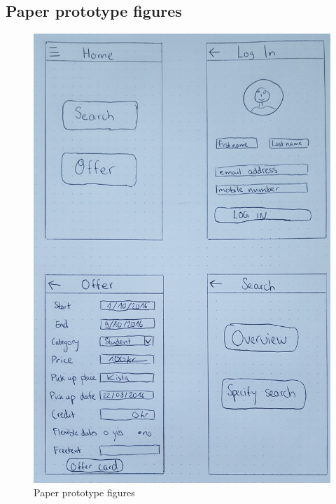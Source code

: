 \documentclass[11pt,twoside,a4paper]{report}
\begin{document}
\begin{appendices}

\chapter{Paper prototype figures}
\thispagestyle{empty}
\newpage

\begin{figure}
	\centering
	\includegraphics[width=\textwidth]{jpg/paper-prototype-1.jpg}
	\caption{Paper prototype figures}
	\label{figure:paper-prototype-1}
\end{figure}


\end{appendices}
\end{document}
